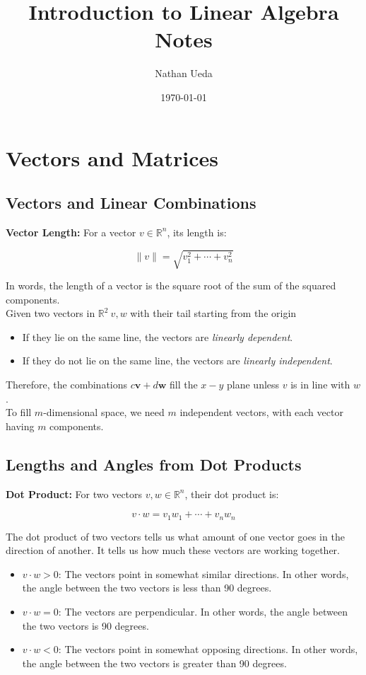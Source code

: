 \documentclass[11pt]{article}
\title{Introduction to Linear Algebra Notes}
\author{Nathan Ueda}
\date{\today}
\begin{document}
\maketitle 
\pagebreak
\tableofcontents 
\pagebreak

\section{Vectors and Matrices}
\subsection{Vectors and Linear Combinations}

\textbf{Vector Length:} For a vector $ v \in \mathbb{R}^n $, its length is:

\[ \|v\|= \sqrt{v_1^2 + \cdots + v_n^2} \]

In words, the length of a vector is the square root of the sum of the squared components. \\

Given two vectors in $\mathbb{R}^2\ v, w$ with their tail starting from the origin
\begin{itemize}
    \item If they lie on the same line, the vectors are \textit{linearly dependent}.
    \item If they do not lie on the same line, the vectors are \textit{linearly independent}.
\end{itemize}
Therefore, the combinations $ c\textbf{v} + d\textbf{w} $ fill the $x-y$ plane unless $v$ is in 
line with $w$. \\

To fill $m$-dimensional space, we need $m$ independent vectors, with each vector having $m$
components.

\subsection{Lengths and Angles from Dot Products}

\textbf{Dot Product:} For two vectors $v, w \in \mathbb{R}^n$, their dot product is:

\[ v \cdot w = v_1 w_1 + \cdots + v_n w_n \]

The dot product of two vectors tells us what amount of one vector goes in the direction of
another. It tells us how much these vectors are working together.

\begin{itemize}
    \item $ v \cdot w > 0 $: The vectors point in somewhat similar directions. In other
    words, the angle between the two vectors is less than 90 degrees.
    \item $ v \cdot w = 0 $: The vectors are perpendicular. In other words, the angle 
    between the two vectors is 90 degrees.
    \item $ v \cdot w < 0 $: The vectors point in somewhat opposing directions. In other
    words, the angle between the two vectors is greater than 90 degrees.
\end{itemize}
\end{document}
